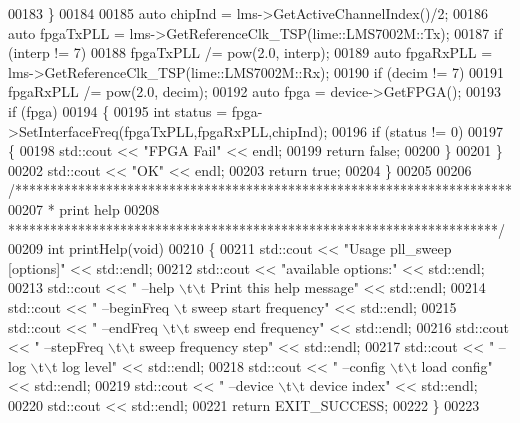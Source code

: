 \begin{DoxyCode}
00183     \}
00184 
00185     \textcolor{keyword}{auto} chipInd = lms->GetActiveChannelIndex()/2;
00186     \textcolor{keyword}{auto} fpgaTxPLL = lms->GetReferenceClk_TSP(lime::LMS7002M::Tx);
00187     \textcolor{keywordflow}{if} (interp != 7)
00188         fpgaTxPLL /= pow(2.0, interp);
00189     \textcolor{keyword}{auto} fpgaRxPLL = lms->GetReferenceClk_TSP(lime::LMS7002M::Rx);
00190     \textcolor{keywordflow}{if} (decim != 7)
00191         fpgaRxPLL /= pow(2.0, decim);
00192     \textcolor{keyword}{auto} fpga = device->GetFPGA();
00193     \textcolor{keywordflow}{if} (fpga)
00194     \{
00195         \textcolor{keywordtype}{int} status = fpga->SetInterfaceFreq(fpgaTxPLL,fpgaRxPLL,chipInd);
00196         \textcolor{keywordflow}{if} (status != 0)
00197         \{
00198             std::cout << \textcolor{stringliteral}{"FPGA Fail"} << endl;
00199             \textcolor{keywordflow}{return} \textcolor{keyword}{false};
00200         \}
00201     \}
00202     std::cout << \textcolor{stringliteral}{"OK"} << endl;
00203     \textcolor{keywordflow}{return} \textcolor{keyword}{true};
00204 \}
00205 
00206 \textcolor{comment}{/***********************************************************************}
00207 \textcolor{comment}{ * print help}
00208 \textcolor{comment}{ **********************************************************************/}
00209 \textcolor{keywordtype}{int} printHelp(\textcolor{keywordtype}{void})
00210 \{
00211     std::cout << \textcolor{stringliteral}{"Usage pll\_sweep [options]"} << std::endl;
00212     std::cout << \textcolor{stringliteral}{"available options:"} << std::endl;
00213     std::cout << \textcolor{stringliteral}{"    --help \(\backslash\)t\(\backslash\)t Print this help message"} << std::endl;
00214     std::cout << \textcolor{stringliteral}{"    --beginFreq \(\backslash\)t sweep start frequency"} << std::endl;
00215     std::cout << \textcolor{stringliteral}{"    --endFreq \(\backslash\)t\(\backslash\)t sweep end frequency"} << std::endl;
00216     std::cout << \textcolor{stringliteral}{"    --stepFreq \(\backslash\)t\(\backslash\)t sweep frequency step"} << std::endl;
00217     std::cout << \textcolor{stringliteral}{"    --log \(\backslash\)t\(\backslash\)t log level"} << std::endl;
00218     std::cout << \textcolor{stringliteral}{"    --config \(\backslash\)t\(\backslash\)t load config"} << std::endl;
00219     std::cout << \textcolor{stringliteral}{"    --device \(\backslash\)t\(\backslash\)t device index"} << std::endl;
00220     std::cout << std::endl;
00221     \textcolor{keywordflow}{return} EXIT\_SUCCESS;
00222 \}
00223 
\end{DoxyCode}
